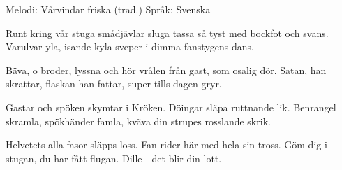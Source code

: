 \begin{song}

\begin{songmeta}
Melodi: Vårvindar friska (trad.)
Språk: Svenska
\end{songmeta}

\begin{songtext}
Runt kring vår stuga smådjävlar sluga
tassa så tyst med bockfot och svans.
Varulvar yla, isande kyla
sveper i dimma fanstygens dans.

Bäva, o broder, lyssna och hör
vrålen från gast, som osalig dör.
Satan, han skrattar, flaskan han fattar,
super tills dagen gryr.

Gastar och spöken skymtar i Kröken.
Döingar släpa ruttnande lik.
Benrangel skramla, spökhänder famla,
kväva din strupes rosslande skrik.

Helvetets alla fasor släpps loss.
Fan rider här med hela sin tross.
Göm dig i stugan, du har fått flugan.
Dille - det blir din lott.
\end{songtext}
\end{song}

